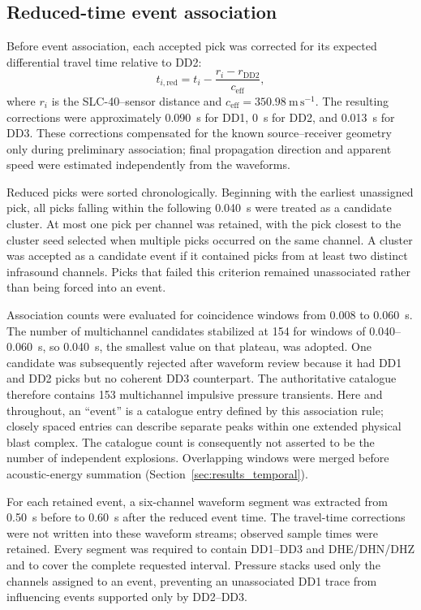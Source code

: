 \documentclass[]{seismica}
\begin{document}
\subsection{Reduced-time event association}

Before event association, each accepted pick was corrected for its expected differential travel time relative to DD2:
\begin{equation}
  t_{i,\mathrm{red}} = t_i - \frac{r_i-r_{\mathrm{DD2}}}{c_{\mathrm{eff}}},
  \label{eq:reduced_time}
\end{equation}
where $r_i$ is the SLC-40--sensor distance and $c_{\mathrm{eff}}=350.98~\mathrm{m\,s^{-1}}$. The resulting corrections were approximately 0.090~s for DD1, 0~s for DD2, and 0.013~s for DD3. These corrections compensated for the known source--receiver geometry only during preliminary association; final propagation direction and apparent speed were estimated independently from the waveforms.

Reduced picks were sorted chronologically. Beginning with the earliest unassigned pick, all picks falling within the following 0.040~s were treated as a candidate cluster. At most one pick per channel was retained, with the pick closest to the cluster seed selected when multiple picks occurred on the same channel. A cluster was accepted as a candidate event if it contained picks from at least two distinct infrasound channels. Picks that failed this criterion remained unassociated rather than being forced into an event.

Association counts were evaluated for coincidence windows from 0.008 to
0.060~s. The number of multichannel candidates stabilized at 154 for windows
of 0.040--0.060~s, so 0.040~s, the smallest value on that plateau, was adopted.
One candidate was subsequently rejected after waveform review because it had
DD1 and DD2 picks but no coherent DD3 counterpart. The authoritative catalogue
therefore contains 153 multichannel impulsive pressure transients. Here and
throughout, an ``event'' is a catalogue entry defined by this association rule;
closely spaced entries can describe separate peaks within one extended physical
blast complex. The catalogue count is consequently not asserted to be the
number of independent explosions. Overlapping windows were merged before
acoustic-energy summation (Section~\ref{sec:results_temporal}).

For each retained event, a six-channel waveform segment was extracted from
0.50~s before to 0.60~s after the reduced event time. The travel-time
corrections were not written into these waveform streams; observed sample
times were retained. Every segment was required to contain DD1--DD3 and
DHE/DHN/DHZ and to cover the complete requested interval. Pressure stacks used
only the channels assigned to an event, preventing an unassociated DD1 trace
from influencing events supported only by DD2--DD3.
\end{document}
